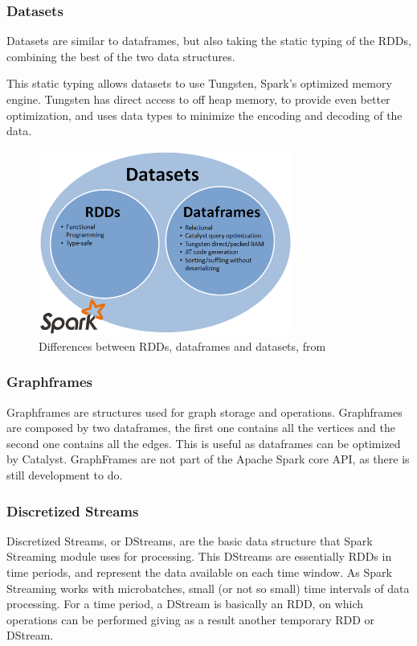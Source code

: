 \documentclass[11pt]{article} %
\begin{document}
      \subsubsection*{Datasets}

        Datasets are similar to dataframes, but also taking the static typing of the RDDs, combining the best of the two data structures.

        This static typing allows datasets to use Tungsten, Spark's optimized memory engine. Tungsten has direct access to off heap memory, to provide even better optimization, and uses data types to minimize the encoding and decoding of the data.

      \begin{figure}[!ht]
        \centering
        \includegraphics[width=0.75\textwidth]{RDD_dataframes_datasets_diagram.png}
        \caption{Differences between RDDs, dataframes and datasets, from \cite{RDD_dataframes_datasets_diagram_blog}}
        \label{img:RDD_dataframes_datasets_diagram}
      \end{figure}

      \subsubsection*{Graphframes}

        Graphframes are structures used for graph storage and operations. Graphframes are composed by two dataframes, the first one contains all the vertices and the second one contains all the edges. This is useful as dataframes can be optimized by Catalyst. GraphFrames are not part of the Apache Spark core API, as there is still development to do.

      \subsubsection*{Discretized Streams}
        Discretized Streams, or DStreams, are the basic data structure that Spark Streaming module uses for processing. This DStreams are essentially RDDs in time periods, and represent the data available on each time window. As Spark Streaming works with microbatches, small (or not so small) time intervals of data processing. For a time period, a DStream is basically an RDD, on which operations can be performed giving as a result another temporary RDD or DStream.
\end{document}
